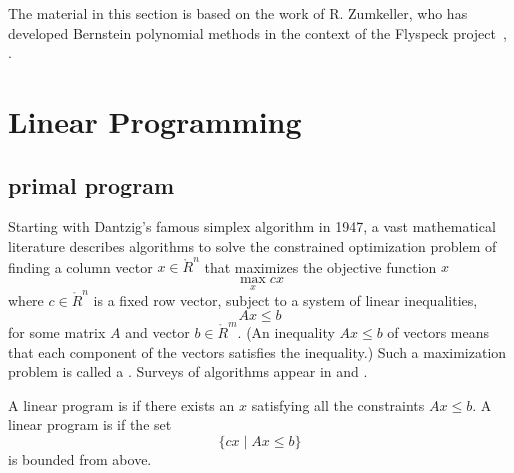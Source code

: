 The material in this section is based on the work of R. Zumkeller, who
has developed Bernstein polynomial methods in the context of the
Flyspeck project~\cite{roland-thesis}, \cite{zumkeller-nonlinear}.


\section{Linear Programming}

\subsection{primal program}

Starting with Dantzig's famous simplex algorithm in 1947, 
a vast mathematical literature describes algorithms to
solve the constrained optimization problem of finding a column vector
$x\in\ring{R}^n$ that maximizes the objective function $ x$
\begin{equation}\label{eqn:lp1}
\max_{x}  c x
\end{equation}
where $c\in\ring{R}^n$ is a fixed row vector, subject to a system of
linear inequalities,
\begin{equation}\label{eqn:lp2}
A x\le b
\end{equation} 
for some matrix $A$ and vector $b\in \ring{R}^m$.  (An inequality $A
x\le b$ of vectors means that each component of the vectors satisfies
the inequality.)  Such a maximization problem is called a
.  Surveys of algorithms appear in
\cite{Wri05} and \cite{Tod02}.

%

A linear program is  if there exists an $x$ satisfying
all the constraints $A x \le b$.  A linear program is 
if the set 
\[
\{c x \mid A x \le b\}
\]
is bounded from above.

